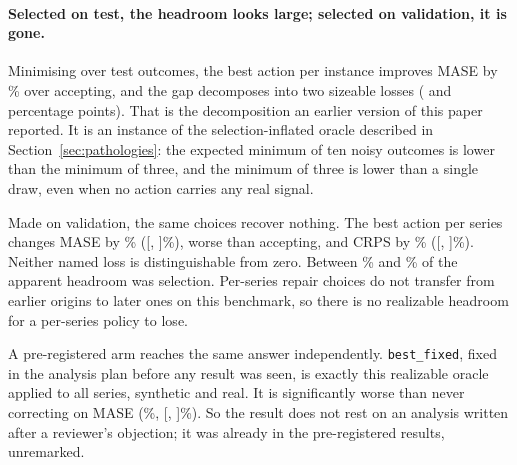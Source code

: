\begin{table}[htbp]
\centering
\caption{The decomposition selected two ways, on \rdMaseNseries{} synthetic series with
ground-truth diagnosis. Rows 1--3 are percentage changes relative to accepting; rows 4--5
are differences between rows, in percentage points. Intervals are 95\% series-level
bootstrap; $\dagger$ marks one excluding zero. The canonical fix involves no
selection, so its two columns are identical. The left column minimises over test
outcomes, and the gap between the columns is the winner's curse.}
\label{tab:regretdecomp}
\small
\fittable{}
\end{table}

\paragraph{Selected on test, the headroom looks large; selected on validation, it is
gone.}
Minimising over test outcomes, the best action per instance improves MASE by
\rdMaseCeilTotalAbs\% over accepting, and the gap decomposes into two sizeable losses
(\rdMaseCeilFirst{} and \rdMaseCeilRestrict{} percentage points). That is the
decomposition an earlier version of this paper reported. It is an instance of the
selection-inflated oracle described in Section~\ref{sec:pathologies}: the expected
minimum of ten noisy outcomes is lower than the minimum of three, and the minimum of
three is lower than a single draw, even when no action carries any real signal.

Made on validation, the same choices recover nothing. The best action per series
changes MASE by \rdMaseRealTotal\% ([\rdMaseRealTotalCIlo, \rdMaseRealTotalCIhi]\%),
worse than accepting, and CRPS by \rdCrpsRealTotal\% ([\rdCrpsRealTotalCIlo,
\rdCrpsRealTotalCIhi]\%). Neither named loss is distinguishable from zero. Between
\rdCrpsCurseShare\% and \rdMaseCurseShare\% of the apparent headroom was selection.
Per-series repair choices do not transfer from earlier origins to later ones on this
benchmark, so there is no realizable headroom for a per-series policy to lose.

A pre-registered arm reaches the same answer independently. \texttt{best\_fixed},
fixed in the analysis plan before any result was seen, is exactly this realizable oracle
applied to all \nseries{} series, synthetic and real. It is significantly worse than
never correcting on MASE (\maseBestFixedVsNeverPct\%, [\maseBestFixedVsNeverCIlo,
\maseBestFixedVsNeverCIhi]\%). So the result does not rest on an analysis written after a
reviewer's objection; it was already in the pre-registered results, unremarked.

